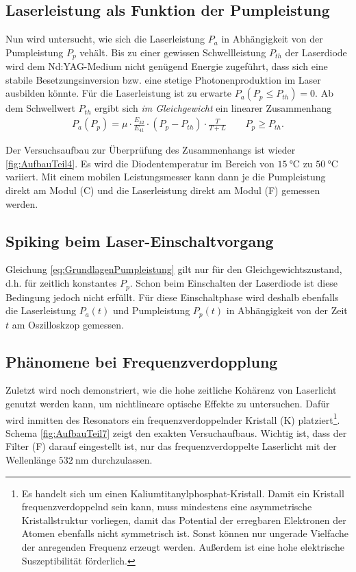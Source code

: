 \documentclass[../main.tex]{subfiles}
\begin{document}
    \subsection{Laserleistung als Funktion der Pumpleistung}
        Nun wird untersucht, wie sich die Laserleistung $P_a$ in Abhängigkeit von der Pumpleistung $P_p$ vehält. Bis zu einer gewissen Schwellleistung $P_{th}$ der Laserdiode wird dem Nd:YAG-Medium nicht genügend Energie zugeführt, dass sich eine stabile Besetzungsinversion bzw. eine stetige Photonenproduktion im Laser ausbilden könnte. Für die Laserleistung ist zu erwarte $P_a(P_p\le P_{th}) = 0$. Ab dem Schwellwert $P_{th}$ ergibt sich \textit{im Gleichgewicht} ein linearer Zusammenhang
        \begin{align}
            P_a(P_p) = \mu\cdot \frac{E_{32}}{E_{41}}\cdot (P_p - P_{th})\cdot\frac{T}{T + L}\qquad P_p\ge P_{th}.    
            \label{eq:GrundlagenPumpleistung}
        \end{align}

        Der Versuchsaufbau zur Überprüfung des Zusammenhangs ist wieder \ref{fig:AufbauTeil4}. Es wird die Diodentemperatur im Bereich von $\SI{15}{\celsius}$ zu $\SI{50}{\celsius}$ variiert. Mit einem mobilen Leistungsmesser kann dann je die Pumpleistung direkt am Modul (C) und die Laserleistung direkt am Modul (F) gemessen werden.

    \subsection{Spiking beim Laser-Einschaltvorgang}
        Gleichung \ref{eq:GrundlagenPumpleistung} gilt nur für den Gleichgewichtszustand, d.h. für zeitlich konstantes $P_p$. Schon beim Einschalten der Laserdiode ist diese Bedingung jedoch nicht erfüllt. Für diese Einschaltphase wird deshalb ebenfalls die Laserleistung $P_a(t)$ und Pumpleistung $P_p(t)$ in Abhängigkeit von der Zeit $t$ am Oszilloskzop gemessen. 

    \subsection{Phänomene bei Frequenzverdopplung}
        Zuletzt wird noch demonstriert, wie die hohe zeitliche Kohärenz von Laserlicht genutzt werden kann, um nichtlineare optische Effekte zu untersuchen. Dafür wird inmitten des Resonators ein frequenzverdoppelnder Kristall (K) platziert\footnote{Es handelt sich um einen Kaliumtitanylphosphat-Kristall. Damit ein Kristall frequenzverdoppelnd sein kann, muss mindestens eine asymmetrische Kristallstruktur vorliegen,  damit das Potential der erregbaren Elektronen der Atomen ebenfalls nicht symmetrisch ist. Sonst können nur ungerade Vielfache der anregenden Frequenz erzeugt werden. Außerdem ist eine hohe elektrische Suszeptibilität förderlich.}. Schema \ref{fig:AufbauTeil7} zeigt den exakten Versuchaufbaus. Wichtig ist, dass der Filter (F) darauf eingestellt ist, nur das frequenzverdoppelte Laserlicht mit der Wellenlänge $\SI{532}{\nano\m}$ durchzulassen. 
\end{document}
